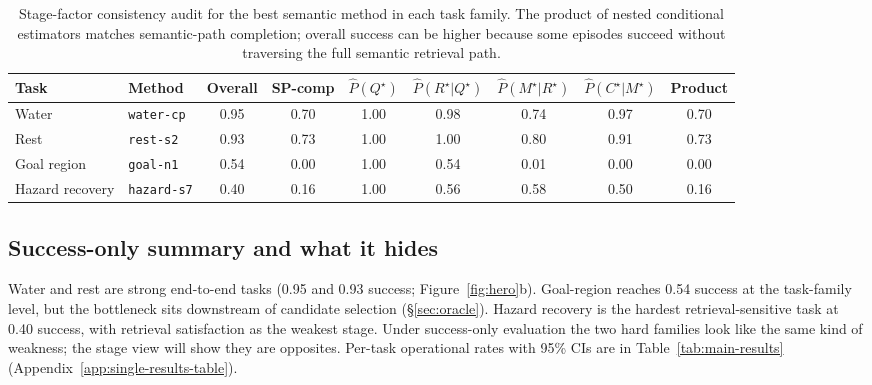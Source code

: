 \documentclass{article}
\begin{document}
\begin{table}[t]
  \caption{Stage-factor consistency audit for the best semantic method in each task family. The product of nested conditional estimators matches semantic-path completion; overall success can be higher because some episodes succeed without traversing the full semantic retrieval path.}
  \label{tab:consistency}
  \centering
  \small
  \begin{tabular}{p{1.7cm}p{2.5cm}c c c c c c c}
    \toprule
    Task & Method & Overall & SP-comp & $\hat P(Q^\star)$ & $\hat P(R^\star|Q^\star)$ & $\hat P(M^\star|R^\star)$ & $\hat P(C^\star|M^\star)$ & Product \\
    \midrule
    Water & \texttt{water-cp} & 0.95 & 0.70 & 1.00 & 0.98 & 0.74 & 0.97 & 0.70 \\
    Rest & \texttt{rest-s2} & 0.93 & 0.73 & 1.00 & 1.00 & 0.80 & 0.91 & 0.73 \\
    Goal region & \texttt{goal-n1} & 0.54 & 0.00 & 1.00 & 0.54 & 0.01 & 0.00 & 0.00 \\
    Hazard recovery & \texttt{hazard-s7} & 0.40 & 0.16 & 1.00 & 0.56 & 0.58 & 0.50 & 0.16 \\
    \bottomrule
  \end{tabular}
\end{table}

\subsection{Success-only summary and what it hides}
\label{sec:single-results}

Water and rest are strong end-to-end tasks (0.95 and 0.93 success; Figure~\ref{fig:hero}b). Goal-region reaches 0.54 success at the task-family level, but the bottleneck sits downstream of candidate selection (\S\ref{sec:oracle}). Hazard recovery is the hardest retrieval-sensitive task at 0.40 success, with retrieval satisfaction as the weakest stage. Under success-only evaluation the two hard families look like the same kind of weakness; the stage view will show they are opposites. Per-task operational rates with 95\% CIs are in Table~\ref{tab:main-results} (Appendix~\ref{app:single-results-table}).
\end{document}
